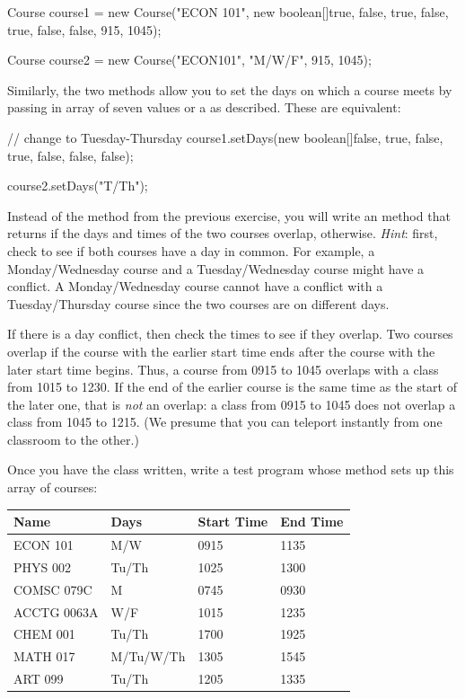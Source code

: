 \begin{exercise}
\begin{code}
Course course1 = new Course("ECON 101",
   new boolean[]{true, false, true, false, true, false, false},
   915, 1045);

Course course2 = new Course("ECON101", "M/W/F", 915, 1045);
\end{code}

Similarly, the two  methods allow you to set the days on which a course meets by passing in array of seven  values or a  as described. These are equivalent:

\begin{code}
// change to Tuesday-Thursday
course1.setDays(new boolean[]{false, true, false, true,
   false, false, false});

course2.setDays("T/Th");
\end{code}

Instead of the  method from the previous exercise, you will write an  method that returns  if the days and times of the two courses overlap,  otherwise.  {\em Hint}: first, check to see if both courses have a day in common. For example, a Monday/Wednesday course and a Tuesday/Wednesday course might have a conflict. A Monday/Wednesday course cannot have a conflict with a Tuesday/Thursday course since the two courses are on different days.

If there is a day conflict, then check the times to see if they overlap. Two courses overlap if the course with the earlier start time ends after the course with the later start time begins.  Thus, a course from 0915 to 1045 overlaps with a class from 1015 to 1230.  If the end of the earlier course is the same time as the start of the later one, that is {\em not} an overlap: a class from 0915 to 1045 does not overlap a class from 1045 to 1215. (We presume that you can teleport instantly from one classroom to the other.)

Once you have the  class written, write a test program whose  method sets up this array of courses:

\begin{tabular}{|l|l|l|l|}
\hline
Name & Days & Start Time & End Time \\ \hline
ECON 101 & M/W & 0915 & 1135 \\ \hline
PHYS 002 & Tu/Th & 1025 & 1300 \\ \hline
COMSC 079C & M & 0745 & 0930 \\ \hline
ACCTG 0063A & W/F & 1015 & 1235 \\ \hline
CHEM 001 & Tu/Th & 1700 & 1925 \\ \hline
MATH 017 & M/Tu/W/Th & 1305 & 1545 \\ \hline
ART 099 & Tu/Th & 1205 & 1335 \\ \hline
\end{tabular}


\end{exercise}
